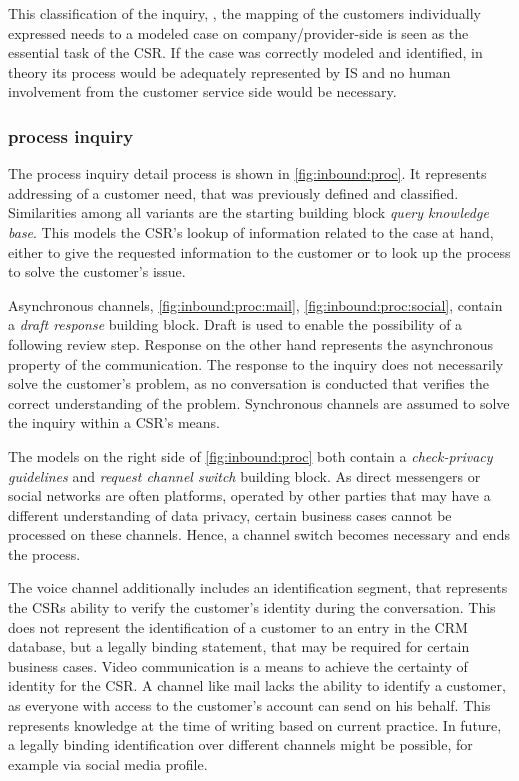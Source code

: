 	 This classification of the inquiry, \ie, the mapping of the customers individually expressed needs to a modeled case on company/provider-side is seen as the essential task of the \acrshort{CSR}. If the case was correctly modeled and identified, in theory its process would be adequately represented by \acrshort{IS} and no human involvement from the customer service side would be necessary. 
	 
	 \subsubsection{process inquiry}
	 
	 The process inquiry detail process is shown in \Fig \ref{fig:inbound:proc}. It represents addressing of a customer need, that was previously defined and classified. Similarities among all variants are the starting building block \textit{query knowledge base}. This models the \acrshort{CSR}'s lookup of information related to the case at hand, either to give the requested information to the customer or to look up the process to solve the customer's issue.  
	 
	 Asynchronous channels, \Fig \ref{fig:inbound:proc:mail}, \ref{fig:inbound:proc:social}, contain a \textit{draft response} building block. Draft is used to enable the possibility of a following review step. Response on the other hand represents the asynchronous property of the communication. The response to the inquiry does not necessarily solve the customer's problem, as no conversation is conducted that verifies the correct understanding of the problem. Synchronous channels are assumed to solve the inquiry within a \acrshort{CSR}'s means. 
	 
	 The models on the right side of \Fig \ref{fig:inbound:proc} both contain a \textit{check-privacy guidelines} and \textit{request channel switch} building block. As direct messengers or social networks are often platforms, operated by other parties that may have a different understanding of data privacy, certain business cases cannot be processed on these channels. Hence, a channel switch becomes necessary and ends the process. 
	 
	 The voice channel additionally includes an identification segment, that represents the \acrshort{CSR}s ability to verify the customer's identity during the conversation. This does not represent the identification of a customer to an entry in the \acrshort{CRM} database, but a legally binding statement, that may be required for certain business cases. Video communication is a means to achieve the certainty of identity for the \acrshort{CSR}.
	 A channel like mail lacks the ability to identify a customer, as everyone with access to the customer's account can send on his behalf. This represents knowledge at the time of writing based on current practice. In future, a legally binding identification over different channels might be possible, for example via social media profile.
	 

